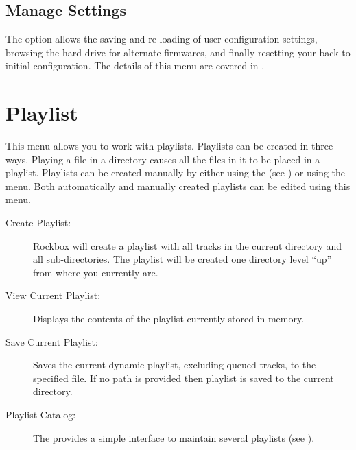 
\subsection{Manage Settings}
The  option allows the saving and re-loading of user 
configuration settings, browsing the hard drive for alternate firmwares, and finally
resetting your \dap{} back to initial configuration.
%
The details of this menu are covered in
.



\section{\label{ref:playlistoptions}Playlist}
  This menu allows you to work with playlists. Playlists can be created in 
  three ways. Playing a file in a directory causes all the files in it
  to be placed in a playlist. Playlists can be created manually by
  either using the   (see ) or using
  the  menu. Both automatically and manually created
  playlists can be edited using this menu.

\begin{description}
\item[Create Playlist:]
  Rockbox will create a playlist with all tracks in the current directory 
and all sub-directories. The playlist will be created one directory level ``up'' 
from where you currently are.
  
\item[View Current Playlist:]
  Displays the contents of the playlist currently stored in memory.
  
\item[Save Current Playlist:]
  Saves the current dynamic playlist, excluding queued tracks, to the 
specified file. If no path is provided then playlist is saved to the current 
directory.

\item[Playlist Catalog:]
  The  provides a simple interface to maintain
  several playlists (see ).
\end{description}

